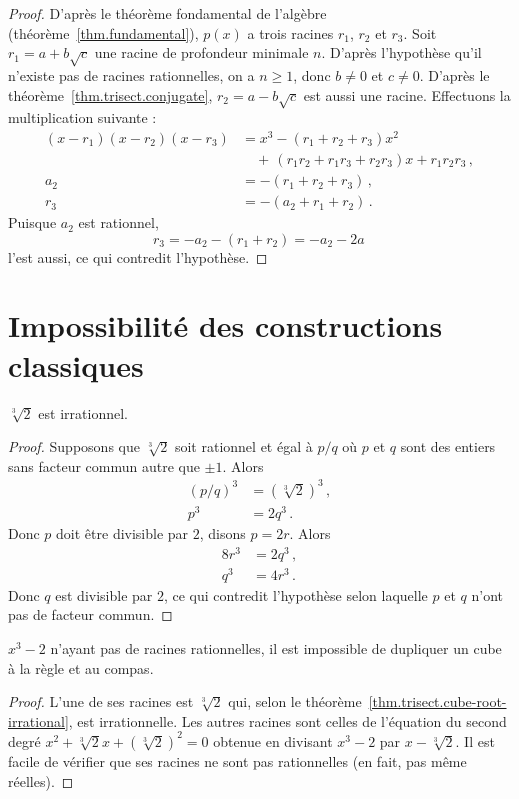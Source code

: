 \begin{proof} D'après le théorème fondamental de l'algèbre (théorème~\ref{thm.fundamental}), $p(x)$ a trois racines $r_1$, $r_2$ et $r_3$. Soit $r_1=a+b\sqrt{c}$ une racine de profondeur minimale $n$. D'après l'hypothèse qu'il n'existe pas de racines rationnelles, on a $n\geq 1$,  donc $b\neq 0$ et $c\neq 0$. D'après le théorème~\ref{thm.trisect.conjugate}, $r_2=a-b\sqrt{c}$ est aussi une racine. Effectuons la multiplication suivante :
\begin{subequations}
\begin{align}
(x-r_1)(x-r_2)(x-r_3)&=x^3 -(r_1+r_2+r_3)x^2\\
&\quad +\, (r_1r_2+r_1r_3+r_2r_3)x + r_1r_2r_3\,,\label{eq.viete3}\\
a_2&=-(r_1+r_2+r_3)\,,\\
r_3&=-(a_2+r_1+r_2)\,.
\end{align}
\end{subequations}
Puisque $a_2$ est  rationnel, 
\[r_3=-a_2-(r_1+r_2)=-a_2-2a\,\]
l'est aussi, ce qui 
contredit l'hypothèse.
\end{proof}


\section{Impossibilité des constructions classiques}\label{s.trisect-impossible}

\begin{theorem}\label{thm.trisect.cube-root-irrational}
$\sqrt[3]{2}$ est irrationnel.
\end{theorem}
\begin{proof}
Supposons que $\sqrt[3]{2}$ soit rationnel et égal à $p/q$ où $p$ et $q$ sont des entiers sans facteur commun autre que $\pm 1$. Alors
\begin{align*}
(p/q)^3&=(\sqrt[3]{2})^3\,,\\
p^3&=2q^3\,.
\end{align*}
Donc $p$ doit être divisible par $2$, disons $p=2r$. Alors 
\begin{align*}
8r^3&=2q^3\,,\\
q^3&=4r^3\,.
\end{align*}
Donc $q$ est divisible par $2$, ce qui contredit l'hypothèse selon laquelle $p$ et $q$ n'ont pas de facteur commun.
\end{proof}

\begin{theorem}
$x^3-2$ n'ayant pas de racines rationnelles, il est  impossible de dupliquer un cube à la règle et au  compas.
\end{theorem}
\begin{proof} L'une de ses racines est $\sqrt[3]{2}$ qui, selon le théorème~\ref{thm.trisect.cube-root-irrational}, est irrationnelle. Les autres racines sont celles de l'équation du second degré  $x^2+\sqrt[3]{2}x+(\sqrt[3]{2})^2=0$ obtenue en divisant $x^3-2$ par $x-\sqrt[3]{2}$. Il est facile de vérifier que ses racines ne sont pas rationnelles (en fait, pas même réelles).
\end{proof}


